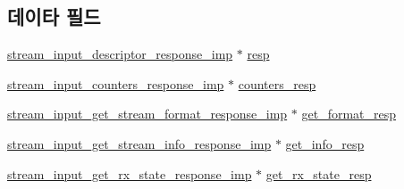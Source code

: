\subsection*{데이타 필드}
\begin{DoxyCompactItemize}
\item 
\hyperlink{classavdecc__lib_1_1stream__input__descriptor__response__imp}{stream\+\_\+input\+\_\+descriptor\+\_\+response\+\_\+imp} $\ast$ \hyperlink{classavdecc__lib_1_1stream__input__descriptor__imp_aa951b788e797f7a00d516ea52ba0b10f}{resp}
\item 
\hyperlink{classavdecc__lib_1_1stream__input__counters__response__imp}{stream\+\_\+input\+\_\+counters\+\_\+response\+\_\+imp} $\ast$ \hyperlink{classavdecc__lib_1_1stream__input__descriptor__imp_abbf0d9b5e4c4436f798156d13c24c795}{counters\+\_\+resp}
\item 
\hyperlink{classavdecc__lib_1_1stream__input__get__stream__format__response__imp}{stream\+\_\+input\+\_\+get\+\_\+stream\+\_\+format\+\_\+response\+\_\+imp} $\ast$ \hyperlink{classavdecc__lib_1_1stream__input__descriptor__imp_a50df3fb45f75a337893f84e4600f37da}{get\+\_\+format\+\_\+resp}
\item 
\hyperlink{classavdecc__lib_1_1stream__input__get__stream__info__response__imp}{stream\+\_\+input\+\_\+get\+\_\+stream\+\_\+info\+\_\+response\+\_\+imp} $\ast$ \hyperlink{classavdecc__lib_1_1stream__input__descriptor__imp_a9a8f69347503a0a0991e736fea3452c5}{get\+\_\+info\+\_\+resp}
\item 
\hyperlink{classavdecc__lib_1_1stream__input__get__rx__state__response__imp}{stream\+\_\+input\+\_\+get\+\_\+rx\+\_\+state\+\_\+response\+\_\+imp} $\ast$ \hyperlink{classavdecc__lib_1_1stream__input__descriptor__imp_a76b63ae360764e834e3a261b748c2591}{get\+\_\+rx\+\_\+state\+\_\+resp}
\end{DoxyCompactItemize}
